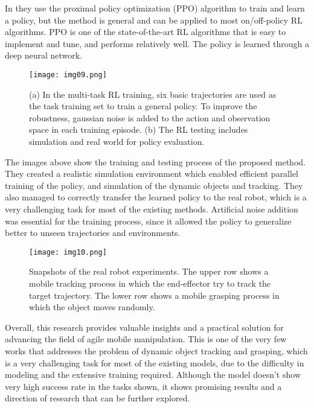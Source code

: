 In \cite{wang2022multitask} they use the proximal policy optimization (PPO) algorithm to train
and learn a policy, but the method is general and can be applied to most on/off-policy RL algorithms.
PPO is one of the state-of-the-art RL algorithms that is easy to implement and tune, and performs
relatively well. The policy is learned through a deep neural network.

\begin{figure}[H]
	\centering
	\texttt{[image: img09.png]}
	\captionsetup{width=1\linewidth}
	\caption{(a) In the multi-task RL training, six basic trajectories are used as the task
		training set to train a general policy. To improve the robustness, gaussian noise is added
		to the action and observation space in each training episode. (b) The RL testing includes
		simulation and real world for policy evaluation.\cite{wang2022multitask}}
	\label{fig:img09}
\end{figure}

The images above show the training and testing process of the proposed method. They created a
realistic simulation environment which enabled efficient parallel training of the policy,
and simulation of the dynamic objects and tracking. They also managed to correctly transfer the
learned policy to the real robot, which is a very challenging task for most of the existing methods.
Artificial noise addition was essential for the training process, since it allowed the policy
to generalize better to unseen trajectories and environments.

\begin{figure}[H]
	\centering
	\texttt{[image: img10.png]}
	\captionsetup{width=1\linewidth}
	\caption{Snapshots of the real robot experiments. The upper row shows a mobile
		tracking process in which the end-effector try to track the target trajectory.
		The lower row shows a mobile grasping process in which the object moves
		randomly. \cite{wang2022multitask}}
	\label{fig:img10}
\end{figure}

Overall, this research provides valuable insights and a practical solution for advancing the
field of agile mobile manipulation. This is one of the very few works that addresses the
problem of dynamic object tracking and grasping, which is a very challenging task for most
of the existing models, due to the difficulty in modeling and the extensive training required. Although
the model doesn't show very high success rate in the tasks shown, it shows promising results
and a direction of research that can be further explored.



